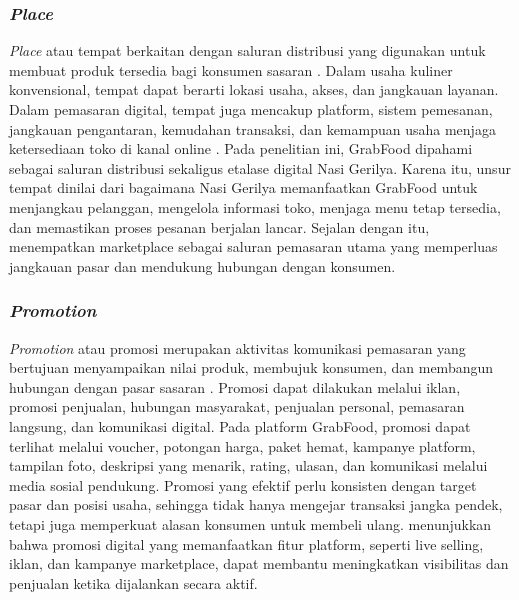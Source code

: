 \subsubsection{\textit{Place}}
\textit{Place} atau tempat berkaitan dengan saluran distribusi yang digunakan untuk membuat produk tersedia bagi konsumen sasaran \parencite{kotler2023principlesmarketing}. Dalam usaha kuliner konvensional, tempat dapat berarti lokasi usaha, akses, dan jangkauan layanan. Dalam pemasaran digital, tempat juga mencakup platform, sistem pemesanan, jangkauan pengantaran, kemudahan transaksi, dan kemampuan usaha menjaga ketersediaan toko di kanal online \parencite{chaffey2022digitalmarketing}. Pada penelitian ini, GrabFood dipahami sebagai saluran distribusi sekaligus etalase digital Nasi Gerilya. Karena itu, unsur tempat dinilai dari bagaimana Nasi Gerilya memanfaatkan GrabFood untuk menjangkau pelanggan, mengelola informasi toko, menjaga menu tetap tersedia, dan memastikan proses pesanan berjalan lancar. Sejalan dengan itu, \textcite{sophia2025rendanggadih} menempatkan marketplace sebagai saluran pemasaran utama yang memperluas jangkauan pasar dan mendukung hubungan dengan konsumen.

\subsubsection{\textit{Promotion}}
\textit{Promotion} atau promosi merupakan aktivitas komunikasi pemasaran yang bertujuan menyampaikan nilai produk, membujuk konsumen, dan membangun hubungan dengan pasar sasaran \parencite{kotler2023principlesmarketing}. Promosi dapat dilakukan melalui iklan, promosi penjualan, hubungan masyarakat, penjualan personal, pemasaran langsung, dan komunikasi digital. Pada platform GrabFood, promosi dapat terlihat melalui voucher, potongan harga, paket hemat, kampanye platform, tampilan foto, deskripsi yang menarik, rating, ulasan, dan komunikasi melalui media sosial pendukung. Promosi yang efektif perlu konsisten dengan target pasar dan posisi usaha, sehingga tidak hanya mengejar transaksi jangka pendek, tetapi juga memperkuat alasan konsumen untuk membeli ulang. \textcite{sophia2025rendanggadih} menunjukkan bahwa promosi digital yang memanfaatkan fitur platform, seperti live selling, iklan, dan kampanye marketplace, dapat membantu meningkatkan visibilitas dan penjualan ketika dijalankan secara aktif.

